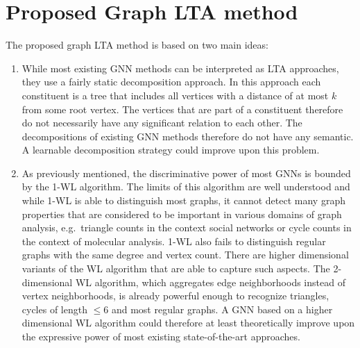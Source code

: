 \documentclass[12pt]{scrartcl}
\begin{document}
\section{Proposed Graph LTA method}%
\label{sec:graph-lta}

The proposed graph LTA method is based on two main ideas:
\begin{enumerate}
	\item While most existing GNN methods can be interpreted as LTA approaches, they use a fairly static decomposition approach.
		In this approach each constituent is a tree that includes all vertices with a distance of at most $k$ from some root vertex.
		The vertices that are part of a constituent therefore do not necessarily have any significant relation to each other.
		The decompositions of existing GNN methods therefore do not have any semantic.
		A learnable decomposition strategy could improve upon this problem.
	\item As previously mentioned, the discriminative power of most GNNs is bounded by the 1-WL algorithm.
		The limits of this algorithm are well understood and while 1-WL is able to distinguish most graphs, it cannot detect many graph properties that are considered to be important in various domains of graph analysis, e.g.\ triangle counts in the context social networks or cycle counts in the context of molecular analysis.
		1-WL also fails to distinguish regular graphs with the same degree and vertex count.
		There are higher dimensional variants of the WL algorithm that are able to capture such aspects.
		The 2-dimensional WL algorithm, which aggregates edge neighborhoods instead of vertex neighborhoods, is already powerful enough to recognize triangles, cycles of length $\leq 6$ and most regular graphs.
		A GNN based on a higher dimensional WL algorithm could therefore at least theoretically improve upon the expressive power of most existing state-of-the-art approaches.
\end{enumerate}

\newpage
{%
\renewcommand{\bibfont}{\normalfont\small}
\setlength{\biblabelsep}{5pt}
\setlength{\bibitemsep}{0.5\baselineskip plus 0.5\baselineskip} %
\setcounter{biburllcpenalty}{9000}
\setcounter{biburlucpenalty}{9999}
\printbibliography%
}
\end{document}

